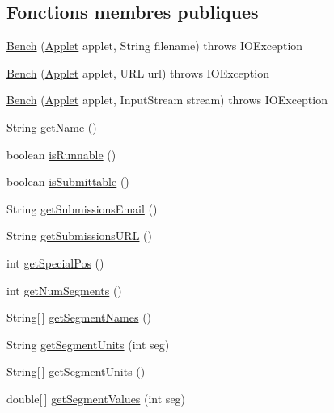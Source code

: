 \subsection*{Fonctions membres publiques}
\begin{DoxyCompactItemize}
\item 
\hyperlink{classjnt_1_1Bench_1_1Bench_aff198cbca9a439e7a2da7a4cc59d0bd3}{Bench} (\hyperlink{classjnt_1_1Bench_1_1Applet}{Applet} applet, String filename)  throws I\-O\-Exception
\item 
\hyperlink{classjnt_1_1Bench_1_1Bench_a888aa428e2cc56203b892b90f2fd1cb3}{Bench} (\hyperlink{classjnt_1_1Bench_1_1Applet}{Applet} applet, U\-R\-L url)  throws I\-O\-Exception
\item 
\hyperlink{classjnt_1_1Bench_1_1Bench_a7945871dc162dd14c09c586ad6dd68ae}{Bench} (\hyperlink{classjnt_1_1Bench_1_1Applet}{Applet} applet, Input\-Stream stream)  throws I\-O\-Exception
\item 
String \hyperlink{classjnt_1_1Bench_1_1Bench_a042cccc7cb34a51489f02ea03380f11d}{get\-Name} ()
\item 
boolean \hyperlink{classjnt_1_1Bench_1_1Bench_a7f92ebd6cde5a2200f33918e572ad109}{is\-Runnable} ()
\item 
boolean \hyperlink{classjnt_1_1Bench_1_1Bench_ab93619fe34006f5b9711628bc9b7f553}{is\-Submittable} ()
\item 
String \hyperlink{classjnt_1_1Bench_1_1Bench_a6cfdde7ffbd8bc2b7d254df34d2010aa}{get\-Submissions\-Email} ()
\item 
String \hyperlink{classjnt_1_1Bench_1_1Bench_a338d608713cd03f88beaeac9175287fa}{get\-Submissions\-U\-R\-L} ()
\item 
int \hyperlink{classjnt_1_1Bench_1_1Bench_a1d7775686d5c5c3ec262935a40ac2d28}{get\-Special\-Pos} ()
\item 
int \hyperlink{classjnt_1_1Bench_1_1Bench_adb01f6f1c649cb97405b6e7293eb0af9}{get\-Num\-Segments} ()
\item 
String\mbox{[}$\,$\mbox{]} \hyperlink{classjnt_1_1Bench_1_1Bench_a99f0050c4666c8e0b184d26e32004a3e}{get\-Segment\-Names} ()
\item 
String \hyperlink{classjnt_1_1Bench_1_1Bench_ac2f2bd6fbe488bcc01e25c0605ebdfd8}{get\-Segment\-Units} (int seg)
\item 
String\mbox{[}$\,$\mbox{]} \hyperlink{classjnt_1_1Bench_1_1Bench_ae69d825062d634fd242e328fa938891c}{get\-Segment\-Units} ()
\item 
double\mbox{[}$\,$\mbox{]} \hyperlink{classjnt_1_1Bench_1_1Bench_a0cd263426221feadeb06a3261c512b7f}{get\-Segment\-Values} (int seg)

\end{DoxyCompactItemize}
